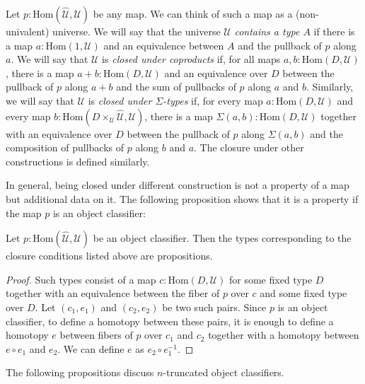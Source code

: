 \documentclass[reqno]{mscs}
\newcommand{\fs}[1]{\mathrm{#1}}
\newcommand{\Hom}{\fs{Hom}}
\numberwithin{figure}{section}
\begin{document}
Let $p : \Hom(\widehat{\mathcal{U}},\mathcal{U})$ be any map.
We can think of such a map as a (non-univalent) universe.
We will say that the universe $\mathcal{U}$ \emph{contains a type $A$} if there is a map $a : \Hom(1,\mathcal{U})$ and an equivalence between $A$ and the pullback of $p$ along $a$.
We will say that $\mathcal{U}$ is \emph{closed under coproducts} if, for all maps $a,b : \Hom(D,\mathcal{U})$, there is a map $a + b : \Hom(D,\mathcal{U})$
and an equivalence over $D$ between the pullback of $p$ along $a + b$ and the sum of pullbacks of $p$ along $a$ and $b$.
Similarly, we will say that $\mathcal{U}$ is \emph{closed under $\Sigma$-types} if, for every map $a : \Hom(D,\mathcal{U})$
and every map $b : \Hom(D \times_\mathcal{U} \widehat{\mathcal{U}}, \mathcal{U})$, there is a map $\Sigma(a,b) : \Hom(D,\mathcal{U})$
together with an equivalence over $D$ between the pullback of $p$ along $\Sigma(a,b)$ and the composition of pullbacks of $p$ along $b$ and $a$.
The closure under other constructions is defined similarly.

In general, being closed under different construction is not a property of a map but additional data on it.
The following proposition shows that it is a property if the map $p$ is an object classifier:

\begin{prop}
Let $p : \Hom(\widehat{\mathcal{U}},\mathcal{U})$ be an object classifier.
Then the types corresponding to the closure conditions listed above are propositions.
\end{prop}
\begin{proof}
Such types consist of a map $c : \Hom(D,\mathcal{U})$ for some fixed type $D$ together with an equivalence between the fiber of $p$ over $c$ and some fixed type over $D$.
Let $(c_1,e_1)$ and $(c_2,e_2)$ be two such pairs.
Since $p$ is an object classifier, to define a homotopy between these pairs, it is enough to define a homotopy $e$ between fibers of $p$ over $c_1$ and $c_2$ together with a homotopy between $e \circ e_1$ and $e_2$.
We can define $e$ as $e_2 \circ e_1^{-1}$.
\end{proof}

The following propositions discuss $n$-truncated object classifiers.
\end{document}
